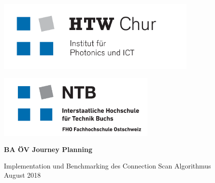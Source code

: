 \begin{titlepage}
\begin{minipage}[t]{0.5\textwidth}
	\begin{flushleft}
		\vspace{0pt}
		\includegraphics[width=0.75\textwidth]{img/htw_chur_IPI_cmyk.png}
	\end{flushleft}
\end{minipage}
\begin{minipage}[t]{0.5\textwidth}
	\begin{flushright}
		\vspace{0pt}
		\vspace{3.5mm}
		\includegraphics[width=0.59\textwidth]{img/NTB-FHO_LOGO.PNG}
	\end{flushright}
\end{minipage}

\begin{center}
\vspace{6cm}

{\LARGE \bfseries BA ÖV Journey Planning\\}

\vspace{9mm}
{\Large Implementation und Benchmarking des Connection Scan Algorithmus\\
	
\vspace{9mm}
August 2018\\[35mm]}


\end{center}
\end{titlepage}

